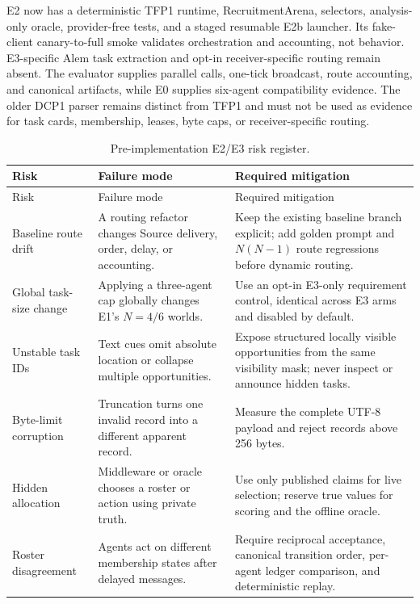 \documentclass[11pt]{article}
\begin{document}
E2 now has a deterministic TFP1 runtime, RecruitmentArena, selectors,
analysis-only oracle, provider-free tests, and a staged resumable E2b launcher.
Its fake-client canary-to-full smoke validates orchestration and accounting,
not behavior.  E3-specific Alem task extraction and opt-in receiver-specific
routing remain absent.  The evaluator supplies parallel calls, one-tick
broadcast, route accounting, and canonical artifacts, while E0 supplies
six-agent compatibility evidence.  The older DCP1 parser remains distinct from
TFP1 and must not be used as evidence for task cards, membership, leases, byte
caps, or receiver-specific routing.

\begin{longtable}{@{}p{}p{}p{}@{}}
\caption{Pre-implementation E2/E3 risk register.}
\label{tab:risks}\\
\toprule
Risk & Failure mode & Required mitigation\\
\midrule
\endfirsthead
\toprule
Risk & Failure mode & Required mitigation\\
\midrule
\endhead
Baseline route drift &
A routing refactor changes Source delivery, order, delay, or accounting. &
Keep the existing baseline branch explicit; add golden prompt and
$N(N-1)$ route regressions before dynamic routing.\\
\addlinespace
Global task-size change &
Applying a three-agent cap globally changes E1's $N=4/6$ worlds. &
Use an opt-in E3-only requirement control, identical across E3 arms and disabled
by default.\\
\addlinespace
Unstable task IDs &
Text cues omit absolute location or collapse multiple opportunities. &
Expose structured locally visible opportunities from the same visibility mask;
never inspect or announce hidden tasks.\\
\addlinespace
Byte-limit corruption &
Truncation turns one invalid record into a different apparent record. &
Measure the complete UTF-8 payload and reject records above 256 bytes.\\
\addlinespace
Hidden allocation &
Middleware or oracle chooses a roster or action using private truth. &
Use only published claims for live selection; reserve true values for scoring
and the offline oracle.\\
\addlinespace
Roster disagreement &
Agents act on different membership states after delayed messages. &
Require reciprocal acceptance, canonical transition order, per-agent ledger
comparison, and deterministic replay.\\

\end{longtable}
\end{document}
